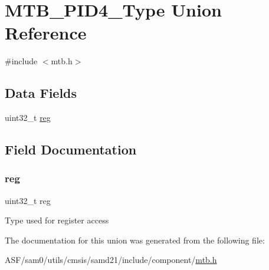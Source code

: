 \hypertarget{union_m_t_b___p_i_d4___type}{}\section{M\+T\+B\+\_\+\+P\+I\+D4\+\_\+\+Type Union Reference}
\label{union_m_t_b___p_i_d4___type}


{\ttfamily \#include $<$mtb.\+h$>$}

\subsection*{Data Fields}
\begin{DoxyCompactItemize}
\item 
uint32\+\_\+t \mbox{\hyperlink{union_m_t_b___p_i_d4___type_a6b91636401516a477989a336376d7b40}{reg}}
\end{DoxyCompactItemize}


\subsection{Field Documentation}
\mbox{\label{union_m_t_b___p_i_d4___type_a6b91636401516a477989a336376d7b40}} 
\subsubsection{\texorpdfstring{reg}{reg}}
{\footnotesize\ttfamily uint32\+\_\+t reg}

Type used for register access 

The documentation for this union was generated from the following file\+:\begin{DoxyCompactItemize}
\item 
A\+S\+F/sam0/utils/cmsis/samd21/include/component/\mbox{\hyperlink{component_2mtb_8h}{mtb.\+h}}\end{DoxyCompactItemize}
